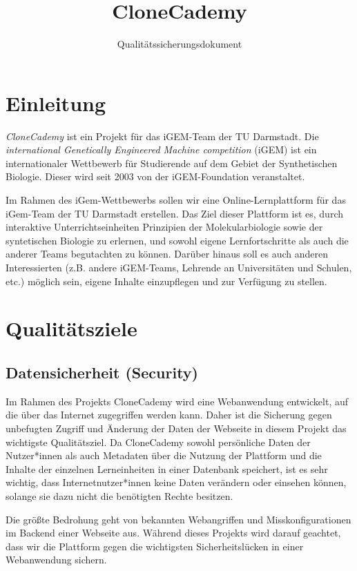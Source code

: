 \documentclass[accentcolor=tud0b,12pt,paper=a4]{tudreport}
\title{CloneCademy}
\subtitle{Qualitätssicherungsdokument}
\begin{document}
\maketitle
\tableofcontents

\chapter{Einleitung}

\emph{CloneCademy} ist ein Projekt für das iGEM-Team der TU Darmstadt. Die \emph{international Genetically Engineered Machine competition} (iGEM) ist ein internationaler Wettbewerb für Studierende auf dem Gebiet der Synthetischen Biologie.
Dieser wird seit 2003 von der iGEM-Foundation veranstaltet. 

Im Rahmen des iGem-Wettbewerbs sollen wir eine Online-Lernplattform für das iGem-Team der TU Darmstadt erstellen. Das Ziel dieser Plattform ist es, durch interaktive Unterrichtseinheiten Prinzipien der Molekularbiologie sowie der syntetischen Biologie zu erlernen, und sowohl eigene Lernfortschritte als auch die anderer Teams begutachten zu können. Darüber hinaus soll es auch anderen Interessierten (z.B. andere iGEM-Teams, Lehrende an Universitäten und Schulen, etc.) möglich sein, eigene Inhalte einzupflegen und zur Verfügung zu stellen.

\chapter{Qualitätsziele}
\section{Datensicherheit (Security)}

Im Rahmen des Projekts CloneCademy wird eine Webanwendung entwickelt, auf die über das Internet zugegriffen werden kann. Daher ist die Sicherung gegen unbefugten Zugriff und Änderung der Daten der Webseite in diesem Projekt das wichtigste Qualitätsziel. Da CloneCademy sowohl persönliche Daten der Nutzer*innen als auch Metadaten über die Nutzung der Plattform und die Inhalte der einzelnen Lerneinheiten in einer Datenbank speichert, ist es sehr wichtig, dass Internetnutzer*innen keine Daten verändern oder einsehen können, solange sie dazu nicht die benötigten Rechte besitzen.
		
Die größte Bedrohung geht von bekannten Webangriffen und Misskonfigurationen im Backend einer Webseite aus. Während dieses Projekts wird darauf geachtet, dass wir die Plattform gegen die wichtigsten Sicherheitslücken in einer Webanwendung sichern.
\end{document}
